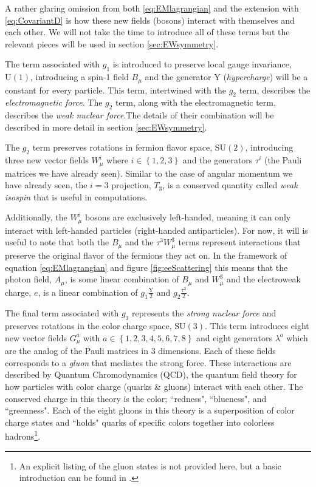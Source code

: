 A rather glaring omission from both \ref{eq:EMlagrangian} and the extension with \ref{eq:CovariantD} is how these new fields (bosons) interact with themselves and each other. We will not take the time to introduce all of these terms but the relevant pieces will be used in section \ref{sec:EWsymmetry}.

The term associated with $g_{1}$ is introduced to preserve local gauge invariance, $\mathrm{U}(1)$, introducing a spin-1 field $B_{\mu}$ and the generator $\mathrm{Y}$ (\textit{hypercharge}) will be a constant for every particle. This term, intertwined with the $g_{2}$ term, describes the \textit{electromagnetic force}. The $g_{2}$ term, along with the electromagnetic term, describes the \textit{weak nuclear force}.The details of their combination will be described in more detail in section \ref{sec:EWsymmetry}. 

The $g_{2}$ term preserves rotations in fermion flavor space, $\mathrm{SU}(2)$, introducing three new vector fields $W^{i}_{\mu}$ where $i \in \left\{1, 2, 3\right\}$ and the generators $\tau^{i}$ (the Pauli matrices we have already seen). Similar to the case of angular momentum we have already seen, the $i=3$ projection, $T_{3}$, is a conserved quantity called \textit{weak isospin} that is useful in computations.

Additionally, the $W^{i}_{\mu}$ bosons are exclusively left-handed, meaning it can only interact with left-handed particles (right-handed antiparticles). For now, it will is useful to note that both the $B_{\mu}$ and the $\tau^{3}W^{3}_{\mu}$ terms represent interactions that preserve the original flavor of the fermions they act on. In the framework of equation \ref{eq:EMlagrangian} and figure \ref{fig:eeScattering} this means that the photon field, $A_{\mu}$, is some linear combination of $B_{\mu}$ and $W^{3}_{\mu}$ and the electroweak charge, $e$, is a linear combination of $g_{1} \frac{\mathrm{Y}}{2}$ and $g_{2} \frac{\tau^{3}}{2}$.

The final term associated with $g_{3}$ represents the \textit{strong nuclear force} and preserves rotations in the color charge space, $\mathrm{SU}(3)$. This term introduces eight new vector fields $G^{a}_{\mu}$ with $a \in \left\{1, 2, 3, 4, 5, 6, 7, 8\right\}$ and eight generators $\lambda^{a}$ which are the analog of the Pauli matrices in 3 dimensions. Each of these fields corresponds to a \textit{gluon} that mediates the strong force. These interactions are described by Quantum Chromodynamics (QCD), the quantum field theory for how particles with color charge (quarks \& gluons) interact with each other. The conserved charge in this theory is the color; ``redness", ``blueness", and ``greenness". Each of the eight gluons in this theory is a superposition of color charge states and ``holds" quarks of specific colors together into colorless hadrons\footnote{An explicit listing of the gluon states is not provided here, but a basic introduction can be found in \cite{Griffiths9:1987tj}.}.

